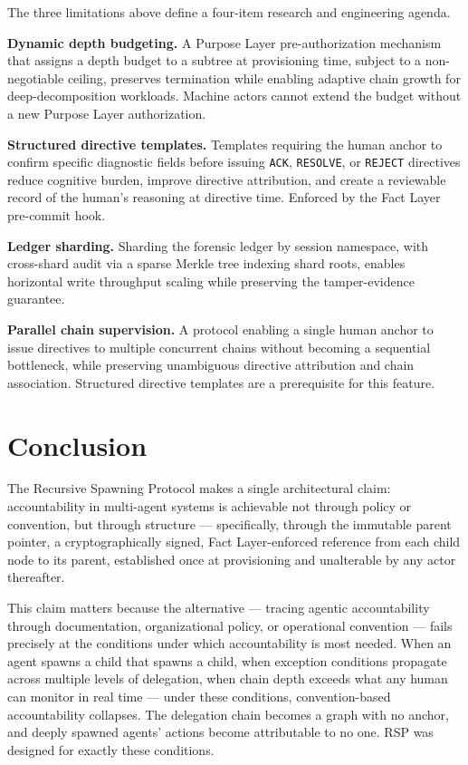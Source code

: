 The three limitations above define a four-item research and engineering agenda.

\textbf{Dynamic depth budgeting.} A Purpose Layer pre-authorization mechanism that assigns a depth budget to a subtree at provisioning time, subject to a non-negotiable ceiling, preserves termination while enabling adaptive chain growth for deep-decomposition workloads. Machine actors cannot extend the budget without a new Purpose Layer authorization.

\textbf{Structured directive templates.} Templates requiring the human anchor to confirm specific diagnostic fields before issuing \texttt{ACK}, \texttt{RESOLVE}, or \texttt{REJECT} directives reduce cognitive burden, improve directive attribution, and create a reviewable record of the human's reasoning at directive time. Enforced by the Fact Layer pre-commit hook.

\textbf{Ledger sharding.} Sharding the forensic ledger by session namespace, with cross-shard audit via a sparse Merkle tree indexing shard roots, enables horizontal write throughput scaling while preserving the tamper-evidence guarantee.

\textbf{Parallel chain supervision.} A protocol enabling a single human anchor to issue directives to multiple concurrent chains without becoming a sequential bottleneck, while preserving unambiguous directive attribution and chain association. Structured directive templates are a prerequisite for this feature.

\section{Conclusion}
\label{sec:rs-conclusion}

The Recursive Spawning Protocol makes a single architectural claim: accountability in multi-agent systems is achievable not through policy or convention, but through structure — specifically, through the immutable parent pointer, a cryptographically signed, Fact Layer-enforced reference from each child node to its parent, established once at provisioning and unalterable by any actor thereafter.

This claim matters because the alternative — tracing agentic accountability through documentation, organizational policy, or operational convention — fails precisely at the conditions under which accountability is most needed. When an agent spawns a child that spawns a child, when exception conditions propagate across multiple levels of delegation, when chain depth exceeds what any human can monitor in real time — under these conditions, convention-based accountability collapses. The delegation chain becomes a graph with no anchor, and deeply spawned agents' actions become attributable to no one. RSP was designed for exactly these conditions.

